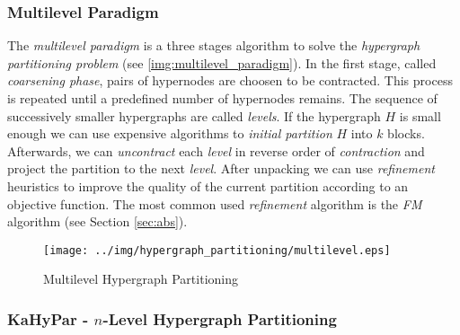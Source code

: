 \subsubsection{Multilevel Paradigm}
\label{sec:multilevel_paradigm}

The \emph{multilevel paradigm} is a three stages algorithm to solve the \emph{hypergraph 
partitioning problem} (see \autoref{img:multilevel_paradigm}). In the first stage, called
\emph{coarsening phase}, pairs of hypernodes are choosen to be contracted. This process is
repeated until a predefined number of hypernodes remains. The sequence of successively
smaller hypergraphs are called \emph{levels}. If the hypergraph $H$ is small enough we can use
expensive algorithms to \emph{initial partition} $H$ into $k$ blocks. Afterwards, we can
\emph{uncontract} each \emph{level} in reverse order of \emph{contraction} and project
the partition to the next \emph{level}. After unpacking we
can use \emph{refinement} heuristics to improve the quality of the current partition according
to an objective function. The most common used \emph{refinement} algorithm is the \emph{FM}
algorithm \cite{fiduccia1988linear} (see Section \ref{sec:abs}).

\begin{figure}
\centering
\texttt{[image: ../img/hypergraph\_partitioning/multilevel.eps]}
\caption{Multilevel Hypergraph Partitioning}
\label{img:multilevel_paradigm}
\end{figure}


\subsubsection{KaHyPar - $n$-Level Hypergraph Partitioning}
\label{sec:kahypar}

